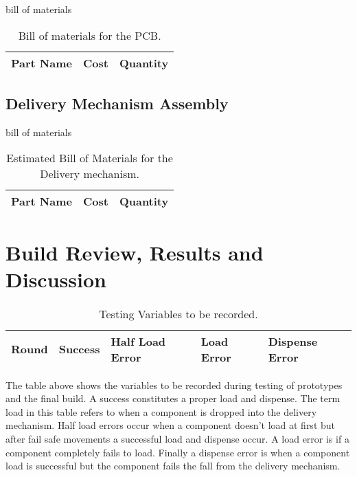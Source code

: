 \documentclass[a4paper,11pt]{article}
\numberwithin{figure}{subsection}
\begin{document}
	bill of materials
	\begin{table}[ht]
	\centering		
	\begin{tabular}{| m{5cm} | m{5cm}| m{5cm} |}
	\hline
	Part Name & Cost & Quantity \\
	\hline
	\end{tabular}
	\caption{Bill of materials for the PCB. \label{tab:bompcb}}
	\label{tab:test3}
	\end{table}	

\subsection{Delivery Mechanism Assembly}
	bill of materials
	\begin{table}[ht]
	\centering		
	\begin{tabular}{| m{5cm} | m{5cm}| m{5cm} |}
	\hline
	Part Name & Cost & Quantity \\
	\hline
	\end{tabular}
	\caption{Estimated Bill of Materials for the Delivery mechanism. \label{tab:bomdel}}
	\label{tab:test2}
	\end{table}	
	
\newpage

\section{Build Review, Results and Discussion}
\begin{table}[ht]
  	\centering
 	 \begin{tabular}{| l | l | l | l | l |}
    \hline
    Round & Success & Half Load Error & Load Error & Dispense Error \\ 
    \hline
    \end{tabular}
  	\caption{Testing Variables to be recorded.}
  	\label{tab:myfirsttable}
	\end{table}

The table above shows the variables to be recorded during testing of prototypes and the final build. A success constitutes a proper load and dispense. The term load in this table refers to when a component is dropped into the delivery mechanism. Half load errors occur when a component doesn't load at first but after fail safe movements a successful load and dispense occur. A load error is if a component completely fails to load. Finally a dispense error is when a component load is successful but the component fails the fall from the delivery mechanism.
\newpage
\end{document}
